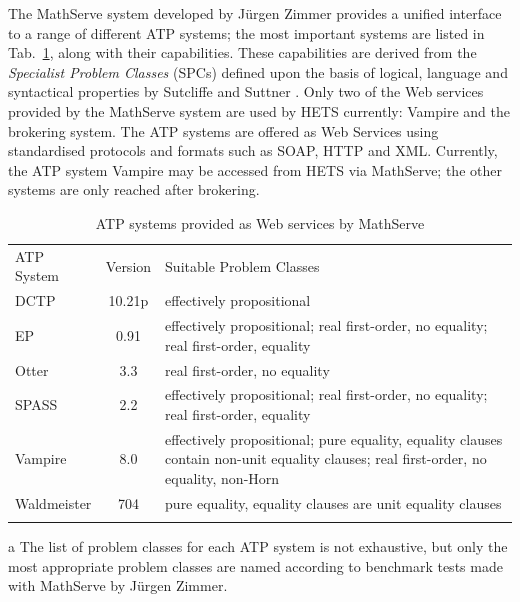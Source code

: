 \documentclass{article}
\newcommand{\normalTEXTSC}[2]{{#1\scriptsize#2}}
\newcommand     {\Hets}{\normalTEXTSC{H}{ETS}\xspace}
\newcommand     {\SPASS}{\normalTEXTSC{S}{PASS}\xspace}
\begin{document}
The MathServe system \cite{ZimmerAutexier06} developed by J\"{u}rgen
Zimmer provides a unified interface to a range of different ATP
systems; the most important systems are listed in
Tab.~\ref{tab:MathServe}, along with their capabilities. These
capabilities are derived from the \emph{Specialist Problem Classes}
(SPCs) defined upon the basis of logical, language and syntactical
properties by Sutcliffe and Suttner \cite{SutcliffeEA:2001:EvalATP}.
Only two of the Web services provided by the MathServe system are used
by \Hets currently: Vampire and the brokering system.  The ATP systems
are offered as Web Services using standardised protocols and formats
such as SOAP, HTTP and XML.  Currently, the ATP system Vampire may be
accessed from \Hets via MathServe; the other systems are only reached
after brokering.

\begin{table}[t]
  \centering
  \begin{threeparttable}
    \begin{tabular}{|l|c|p{7cm}|}\firsthline
      ATP System & Version & Suitable Problem Classes\tnote{a}\\
      \hhline{|=|=|=|}
      DCTP & 10.21p & effectively propositional \\\hline
      EP & 0.91 & effectively propositional; real first-order, no
      equality; real first-order, equality\\\hline
      Otter & 3.3 & real first-order, no equality\\\hline
      \SPASS & 2.2 & effectively propositional; real first-order, no
      equality; real first-order, equality\\\hline
      Vampire & 8.0 & effectively propositional; pure equality, equality
      clauses contain non-unit equality clauses; real first-order, no
      equality, non-Horn\\\hline
      Waldmeister & 704 & pure equality, equality clauses are unit
      equality clauses\\\lasthline
    \end{tabular}
    \begin{tablenotes}\footnotesize
    \item[a]
      {The list of problem classes for each ATP system is not
        exhaustive, but only the most appropriate problem classes are
        named according to benchmark tests made with MathServe by
        J\"urgen Zimmer.}
    \end{tablenotes}
  \end{threeparttable}
  \caption{ATP systems provided as Web services by MathServe}
\vspace*{-4mm}
  \label{tab:MathServe}
\end{table}
\end{document}
